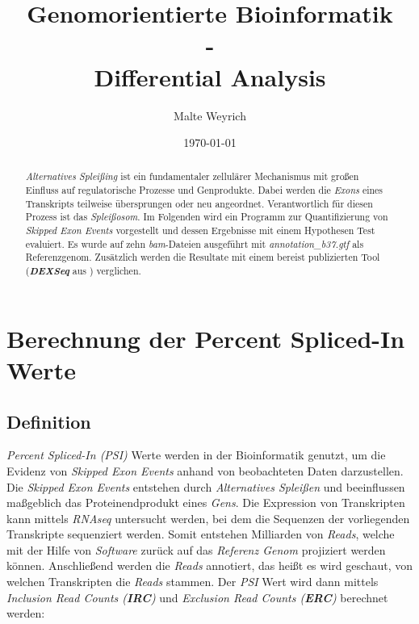 \documentclass[12pt]{article}
\title{Genomorientierte Bioinformatik \\ - \\ Differential Analysis}
\author{Malte Weyrich}
\date{\today}
\begin{document}
\maketitle
\begin{abstract}
\textit{Alternatives Splei\ss ing} ist ein fundamentaler zellulärer Mechanismus  mit 
gro\ss en Einfluss auf regulatorische Prozesse und Genprodukte.
Dabei werden die \textit{Exons} eines Transkripts teilweise übersprungen oder neu angeordnet. 
Verantwortlich für diesen Prozess ist das \textit{Splei\ss osom}. 
Im Folgenden wird ein Programm zur Quantifizierung von \textit{Skipped Exon Events} vorgestellt und
dessen Ergebnisse mit einem Hypothesen Test evaluiert. 
Es wurde auf zehn \textit{bam}-Dateien ausgeführt mit \textit{annotation\_b37.gtf}
als Referenzgenom.
Zusätzlich werden die Resultate mit einem bereist publizierten Tool (\textit{\textbf{DEXSeq}} aus \cite{anders2012detecting}) verglichen.

\end{abstract}

\newpage

\tableofcontents

\newpage


\section{Berechnung der Percent Spliced-In Werte}
\subsection{Definition}\label{sec:Definition}
\textit{Percent Spliced-In (PSI)} Werte werden in der Bioinformatik genutzt, um die 
Evidenz von \textit{Skipped Exon Events} anhand von beobachteten Daten darzustellen. 
Die \textit{Skipped Exon Events} entstehen durch \textit{Alternatives Splei\ss en} und beeinflussen ma\ss geblich das Proteinendprodukt
eines \textit{Gens}.
Die Expression von Transkripten kann mittels \textit{RNAseq} untersucht werden, bei dem die Sequenzen der
vorliegenden Transkripte sequenziert werden.
Somit entstehen Milliarden von \textit{Reads}, welche 
mit der Hilfe von \textit{Software} zurück auf das \textit{Referenz Genom} projiziert werden können.
Anschlie\ss end werden die \textit{Reads} annotiert, das hei\ss t es wird geschaut, von 
welchen Transkripten die \textit{Reads} stammen. 
Der \textit{PSI} Wert wird dann mittels \textit{Inclusion Read Counts (\textbf{IRC})} und \textit{Exclusion Read Counts (\textbf{ERC})} berechnet werden:
\end{document}
